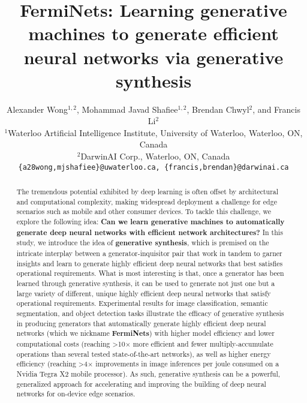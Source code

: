 \documentclass{article}
\title{FermiNets: Learning generative machines to generate efficient neural networks via generative synthesis}
\author{
  Alexander Wong$^{1,2}$, Mohammad Javad Shafiee$^{1,2}$, Brendan Chwyl$^2$, and Francis Li$^2$\\
  $^{1}$Waterloo Artificial Intelligence Institute, University of Waterloo, Waterloo, ON, Canada\\
  $^{2}$DarwinAI Corp., Waterloo, ON, Canada\\
  \texttt{\{a28wong,mjshafiee\}@uwaterloo.ca, \{francis,brendan\}@darwinai.ca}
}
\begin{document}

\maketitle

\begin{abstract}
The tremendous potential exhibited by deep learning is often offset by architectural and computational complexity, making widespread deployment a challenge for edge scenarios such as mobile and other consumer devices.  To tackle this challenge, we explore the following idea: \textbf{Can we learn generative machines to automatically generate deep neural networks with efficient network architectures?}  In this study, we introduce the idea of \textbf{generative synthesis}, which is premised on the intricate interplay between a generator-inquisitor pair that work in tandem to garner insights and learn to generate highly efficient deep neural networks that best satisfies operational requirements.  What is most interesting is that, once a generator has been learned through generative synthesis, it can be used to generate not just one but a large variety of different, unique highly efficient deep neural networks that satisfy operational requirements.  Experimental results for image classification, semantic segmentation, and object detection tasks illustrate the efficacy of generative synthesis in producing generators that automatically generate highly efficient deep neural networks (which we nickname \textbf{FermiNets}) with higher model efficiency and lower computational costs (reaching >10$\times$ more efficient and fewer multiply-accumulate operations than several tested state-of-the-art networks), as well as higher energy efficiency (reaching >4$\times$ improvements in image inferences per joule consumed on a Nvidia Tegra X2 mobile processor).  As such, generative synthesis can be a powerful, generalized approach for accelerating and improving the building of deep neural networks for on-device edge scenarios.
\end{abstract}
\end{document}
